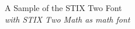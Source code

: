 \documentclass[11pt]{article}
\begin{document}
{\LARGE \noindent A Sample of the STIX Two Font}\\

{\large \noindent \textit{with STIX Two Math as math font}}\\[5pt]


\end{document}
